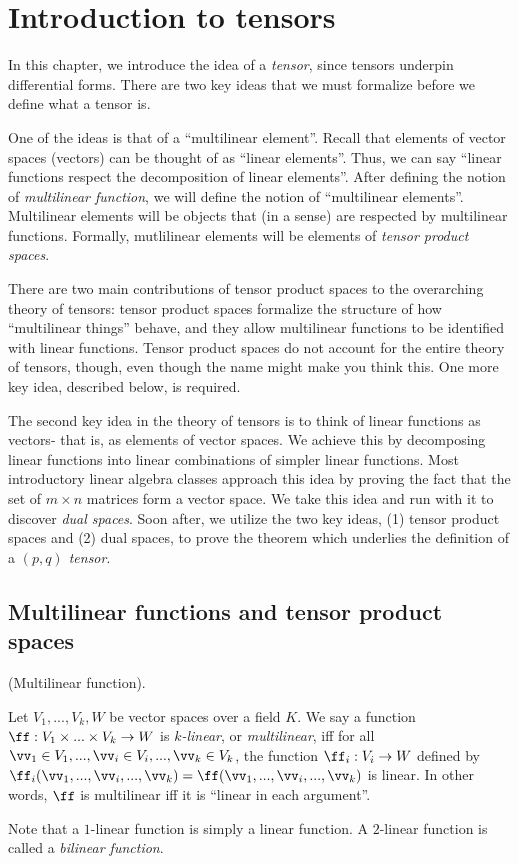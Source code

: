 \chapter{Introduction to tensors}
\label{ch::motivated_intro}

In this chapter, we introduce the idea of a \textit{tensor}, since tensors underpin differential forms. There are two key ideas that we must formalize before we define what a tensor is.

One of the ideas is that of a ``multilinear element''. Recall that elements of vector spaces (vectors) can be thought of as ``linear elements''. Thus, we can say ``linear functions respect the decomposition of linear elements''. After defining the notion of \textit{multilinear function}, we will define the notion of ``multilinear elements''. Multilinear elements will be objects that (in a sense) are respected by multilinear functions. Formally, mutlilinear elements will be elements of \textit{tensor product spaces}. 

There are two main contributions of tensor product spaces to the overarching theory of tensors: tensor product spaces formalize the structure of how ``multilinear things'' behave, and they allow multilinear functions to be identified with linear functions. Tensor product spaces do not account for the entire theory of tensors, though, even though the name might make you think this. One more key idea, described below, is required.

The second key idea in the theory of tensors is to think of linear functions as vectors- that is, as elements of vector spaces. We achieve this by decomposing linear functions into linear combinations of simpler linear functions. Most introductory linear algebra classes approach this idea by proving the fact that the set of $m \times n$ matrices form a vector space. We take this idea and run with it to discover \textit{dual spaces}. Soon after, we utilize the two key ideas, (1) tensor product spaces and (2) dual spaces, to prove the theorem which underlies the definition of a \textit{$(p, q)$ tensor}.

\section{Multilinear functions and tensor product spaces}

\begin{defn}
    (Multilinear function).
    
    Let $V_1, ..., V_k, W$ be vector spaces over a field $K$. We say a function $\ff:V_1 \times ... \times V_k \rightarrow W$ is \textit{$k$-linear}, or \textit{multilinear}, iff for all $\vv_1 \in V_1, ..., \vv_i \in V_i, ..., \vv_k \in V_k$, the function $\ff_i:V_i \rightarrow W$ defined by $\ff_i(\vv_1, ..., \vv_i, ..., \vv_k) = \ff(\vv_1, ..., \vv_i, ..., \vv_k)$ is linear. In other words, $\ff$ is multilinear iff it is ``linear in each argument''. 
    
    Note that a $1$-linear function is simply a linear function. A $2$-linear function is called a \textit{bilinear function}.
\end{defn}


